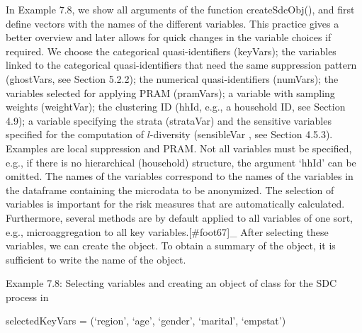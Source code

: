 \documentclass[letterpaper,10pt,english]{sphinxmanual}
\begin{document}
In Example 7.8, we show all arguments of the function createSdcObj(),
and first define vectors with the names of the different variables. This
practice gives a better overview and later allows for quick changes in
the variable choices if required. We choose the categorical
quasi-identifiers (keyVars); the variables linked to the categorical
quasi-identifiers that need the same suppression pattern (ghostVars, see
Section 5.2.2); the numerical quasi-identifiers (numVars); the variables
selected for applying PRAM (pramVars); a variable with sampling weights
(weightVar); the clustering ID (hhId, e.g., a household ID, see Section
4.9); a variable specifying the strata (strataVar) and the sensitive
variables specified for the computation of \(l\)-diversity
(sensibleVar , see Section 4.5.3).  Examples are local suppression and
PRAM. Not all variables must be specified, e.g., if there is no
hierarchical (household) structure, the argument ‘hhId’ can be omitted.
The names of the variables correspond to the names of the variables in
the dataframe containing the microdata to be anonymized. The selection
of variables is important for the risk measures that are automatically
calculated. Furthermore, several methods are by default applied to all
variables of one sort, e.g., microaggregation to all key
variables.{[}\#foot67{]}\_ After selecting these variables, we can
create the  object. To obtain a summary of the object, it is
sufficient to write the name of the object.

Example 7.8: Selecting variables and creating an object of class
 for the SDC process in 

\begin{DUlineblock}{0em}
\item[] 
\item[] 
\item[] 
\item[] selectedKeyVars = (‘region’, ‘age’, ‘gender’, ‘marital’,
‘empstat’)
\end{DUlineblock}
\end{document}
